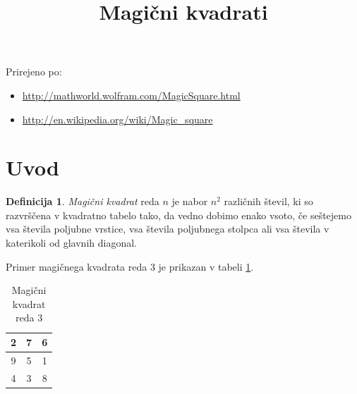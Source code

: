\documentclass[a4paper,12pt]{article}
\title{Magični kvadrati} \date{}
\theoremstyle{definition}
\newtheorem{definicija}{Definicija}
\theoremstyle{plain}
\begin{document}
\maketitle

Prirejeno po:

\begin{itemize}
   \item \url{http://mathworld.wolfram.com/MagicSquare.html}
   \item \url{http://en.wikipedia.org/wiki/Magic_square}
\end{itemize}

\tableofcontents

\newpage

\section{Uvod}

\begin{definicija}
   \emph{Magični kvadrat} reda \(n\) je nabor \(n^2\) različnih števil,
   ki so razvrščena v kvadratno tabelo tako, da vedno dobimo enako vsoto,
   če seštejemo vsa števila poljubne vrstice, vsa števila poljubnega
   stolpca ali vsa števila v katerikoli od glavnih diagonal.
\end{definicija}

Primer magičnega kvadrata reda 3 je prikazan v tabeli \ref{table:mag3}. %

\begin{table}[!ht]
   \centering
   \caption{Magični kvadrat reda 3}
   \label{table:mag3}
   \large
   \begin{tabular}{|c|c|c|}
      \hline
      2 & 7 & 6 \\\hline
      9 & 5 & 1 \\\hline
      4 & 3 & 8 \\\hline
   \end{tabular}
   \normalsize
\end{table}
\end{document}
